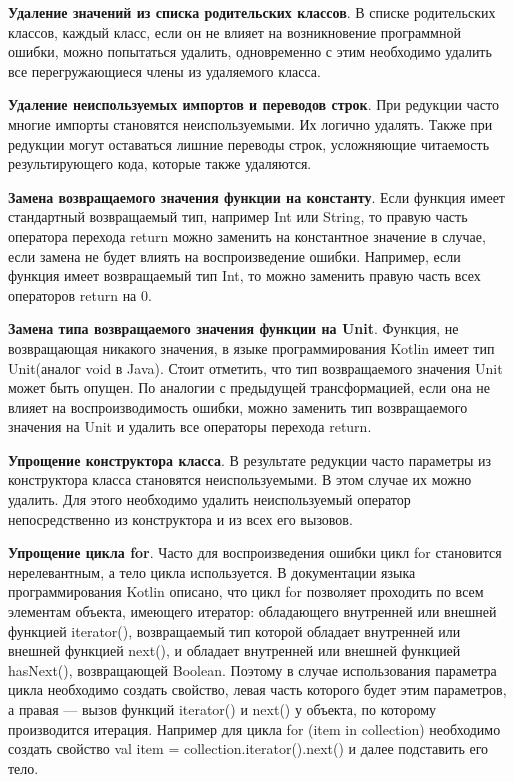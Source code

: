 \textbf{Удаление значений из списка родительских классов}. В списке родительских классов, каждый класс, если он не влияет на возникновение программной ошибки, можно попытаться удалить, одновременно с этим необходимо удалить все перегружающиеся члены из удаляемого класса.

\textbf{Удаление неиспользуемых импортов и переводов строк}. При редукции часто многие импорты становятся неиспользуемыми. Их логично удалять. Также при редукции могут оставаться лишние переводы строк, усложняющие читаемость результирующего кода, которые также удаляются.

\textbf{Замена возвращаемого значения функции на константу}. Если функция имеет стандартный возвращаемый тип, например Int или String, то правую часть оператора перехода return можно заменить на константное значение в случае, если замена не будет влиять на воспроизведение ошибки. Например, если функция имеет возвращаемый тип Int, то можно заменить правую часть всех операторов return на 0.

\textbf{Замена типа возвращаемого значения функции на Unit}. Функция, не возвращающая никакого значения, в языке программирования Kotlin имеет тип Unit(аналог void в Java). Стоит отметить, что тип возвращаемого значения Unit может быть опущен. По аналогии с предыдущей трансформацией, если она не влияет на воспроизводимость ошибки, можно заменить тип возвращаемого значения на Unit и удалить все операторы перехода return.

\textbf{Упрощение конструктора класса}. В результате редукции часто параметры из конструктора класса становятся неиспользуемыми. В этом случае их можно удалить. Для этого необходимо удалить неиспользуемый оператор непосредственно из конструктора и из всех его вызовов.

\textbf{Упрощение цикла for}. Часто для воспроизведения ошибки цикл for становится нерелевантным, а тело цикла используется. В документации языка программирования Kotlin описано, что цикл for позволяет проходить по всем элементам объекта, имеющего итератор:
обладающего внутренней или внешней функцией iterator(), возвращаемый тип которой обладает внутренней или внешней функцией next(), и обладает внутренней или внешней функцией hasNext(), возвращающей Boolean. Поэтому в случае использования параметра цикла необходимо создать свойство, левая часть которого будет этим параметров, а правая --- вызов функций iterator() и next() у объекта, по которому производится итерация. Например для цикла {\ttfamily for (item in collection)} необходимо создать свойство {\ttfamily val item = collection.iterator().next()} и далее подставить его тело.

